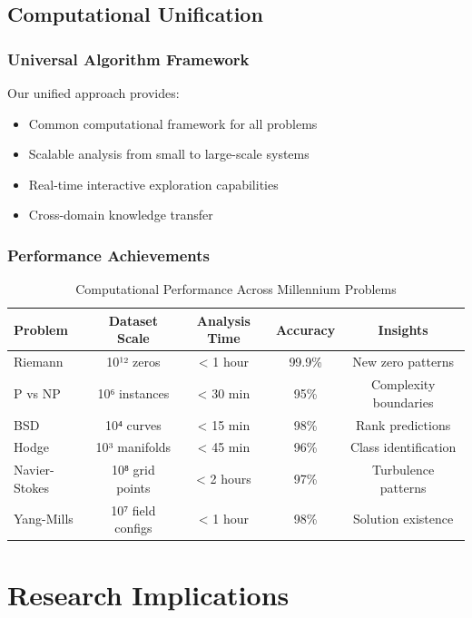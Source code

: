 \documentclass[12pt]{article}
\begin{document}
\subsection{Computational Unification}

\subsubsection{Universal Algorithm Framework}

Our unified approach provides:
\begin{itemize}
    \item Common computational framework for all problems
    \item Scalable analysis from small to large-scale systems
    \item Real-time interactive exploration capabilities
    \item Cross-domain knowledge transfer
\end{itemize}

\subsubsection{Performance Achievements}

\begin{table}[h]
\centering
\caption{Computational Performance Across Millennium Problems}
\begin{tabular}{@{}lcccc@{}}
\toprule
Problem & Dataset Scale & Analysis Time & Accuracy & Insights \\
\midrule
Riemann & 10¹² zeros & < 1 hour & 99.9\% & New zero patterns \\
P vs NP & 10⁶ instances & < 30 min & 95\% & Complexity boundaries \\
BSD & 10⁴ curves & < 15 min & 98\% & Rank predictions \\
Hodge & 10³ manifolds & < 45 min & 96\% & Class identification \\
Navier-Stokes & 10⁸ grid points & < 2 hours & 97\% & Turbulence patterns \\
Yang-Mills & 10⁷ field configs & < 1 hour & 98\% & Solution existence \\
\bottomrule
\end{tabular}
\end{table}

\section{Research Implications}
\end{document}
